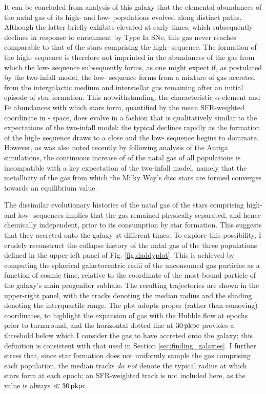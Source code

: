 It can be concluded from analysis of this galaxy that the elemental abundances of the natal gas of its high- and low-\afe{} populations evolved along distinct paths. Although the latter briefly exhibits elevated \afe{} at early times, which subsequently declines in response to enrichment by Type Ia SNe, this gas never reaches \afe{} comparable to that of the stars comprising the high-\afe{} sequence. The formation of the high-\afe{} sequence is therefore not imprinted in the abundances of the gas from which the low-\afe{} sequence subsequently forms, as one might expect if, as postulated by the two-infall model, the low-\afe{} sequence forms from a mixture of gas accreted from the intergalactic medium and interstellar gas remaining after an initial episode of star formation. This notwithstanding, the characteristic $\alpha$-element and Fe abundances with which stars form, quantified by the mean SFR-weighted coordinate in \afe{}-\feh{} space, does evolve in a fashion that is qualitatively similar to the expectations of the two-infall model: the typical \afe{} declines rapidly as the formation of the high-\afe{} sequence draws to a close and the low-\afe{} sequence begins to dominate. However, as was also noted recently by \citet{2017arXiv170807834G} following analysis of the Auriga simulations, the continuous increase of \feh{} of the natal gas of all populations is incompatible with a key expectation of the two-infall model, namely that the metallicity of the gas from which the Milky Way's disc stars are formed converges towards an equilibrium value.

The dissimilar evolutionary histories of the natal gas of the stars comprising high- and low-\afe{} sequences implies that the gas remained physically separated, and hence chemically independent, prior to its consumption by star formation. This suggests that they accreted onto the galaxy at different times. To explore this possibility, I crudely reconstruct the collapse history of the natal gas of the three populations defined in the upper-left panel of Fig. \ref{fig:daddyplot}. This is achieved by computing the spherical galactocentric radii of the unconsumed gas particles as a function of cosmic time, relative to the coordinate of the most-bound particle of the galaxy's main progenitor subhalo. The resulting trajectories are shown in the upper-right panel, with the tracks denoting the median radius and the shading denoting the interquartile range. The plot adopts proper (rather than comoving) coordinates, to highlight the expansion of gas with the Hubble flow at epochs prior to turnaround, and the horizontal dotted line at $30\,{\rm pkpc}$ provides a threshold below which I consider the gas to have accreted onto the galaxy; this definition is consistent with that used in Section \ref{sec:finding_galaxies}. I further stress that, since star formation does not uniformly sample the gas comprising each population, the median tracks \emph{do not} denote the typical radius at which stars form at each epoch;  an SFR-weighted track is not included here, as the value is always $\ll 30\,{\rm pkpc}$. 

